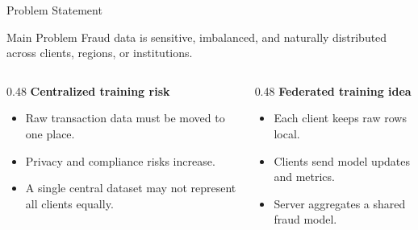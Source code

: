 \documentclass[aspectratio=169,10pt]{beamer}
\begin{document}
\begin{frame}{Problem Statement}
  \begin{block}{Main Problem}
    Fraud data is sensitive, imbalanced, and naturally distributed across clients, regions, or institutions.
  \end{block}
  \begin{columns}[T]
    \begin{column}{0.48\textwidth}
      \textbf{Centralized training risk}
      \begin{itemize}
        \item Raw transaction data must be moved to one place.
        \item Privacy and compliance risks increase.
        \item A single central dataset may not represent all clients equally.
      \end{itemize}
    \end{column}
    \begin{column}{0.48\textwidth}
      \textbf{Federated training idea}
      \begin{itemize}
        \item Each client keeps raw rows local.
        \item Clients send model updates and metrics.
        \item Server aggregates a shared fraud model.
      \end{itemize}
    \end{column}
  \end{columns}
\end{frame}
\end{document}

